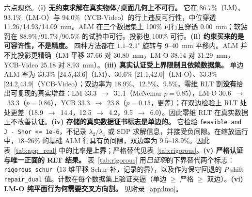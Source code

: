 六点观察。\textbf{(i) 无约束求解在真实物体/桌面几何上不可行。} 它在 86.7\%（LM）、93.1\%（LM-O）与 94.0\%（YCB-Video）的行上违反可行性，中位穿透 11.26/14.93/14.09~mm。ALM 在三个数据集上 100\% 可行且穿透 0.00~mm；软惩罚在 88.9\%/91.7\%/90.5\% 的试验中可行。投影也 100\% 可行。\textbf{(ii) 约束买来的是可容许性，不是精度。} 四种方法都在 $1.1$--$2.1^\circ$ 旋转与 9--40~mm 平移内。ALM 并不比投影更精确（LM 平移 37.66 对 30.80~mm，LM-O 38.14 对 31.29~mm，YCB-Video 25.18 对 8.93~mm）。\textbf{(iii) 真实认证受上界限制且依赖数据集。} 单边 ALM 率为 33.3\% [24.5,43.6]（LM）、30.6\% [21.1,42.0]（LM-O）、33.3\% [24.2,43.9]（YCB-Video）；双边率为 18.9\%、12.5\%、9.5\%。零维 RLT 割\textbf{没有}给出可复现的真实增益：LM 33.3~$\to$~31.1（McNemar $p=0.85$），LM-O 30.6~$\to$~33.3（$p=0.86$），YCB 33.3~$\to$~23.8（$p=0.15$，更差）；在双边检验上 RLT 处处更差（18.9~$\to$~14.4，12.5~$\to$~4.2，9.5~$\to$~6.0）。因此零维 RLT 在真实数据上不改善认证。\textbf{(iv) 存储的真实数据证书标志是单边的。} 它检验 \texttt{feasible and J - Shor <= 1e-6}，不记录 $\lambda_2/\lambda_1$ 或 SDP 求解信息，并接受负间隙。在缩放运行中，18--26\% 的基础 ALM 行具有负间隙，双边率为 9.5--18.9\%。因此表~\ref{tab:app_real} 中的比率是\textbf{上界}；严格替代见表~\ref{tab:rigorous}。\textbf{(v) 严格认证与唯一正面的 RLT 结果。} 表~\ref{tab:rigorous} 用\emph{已证明}的下界替代两个标志：\texttt{rigorous\_schur}（13 维平移 Schur 补，记录的界），以及作为保守回退的 $P$-shift \texttt{repair\_dual} 值。计数在每个数据集上验证夹逼（单边 $\ge$ 严格 $\ge$ 双边）。\textbf{(vi) LM-O 纯平面行为何需要交叉方向割。} 见附录~\ref{app:lmo}。

